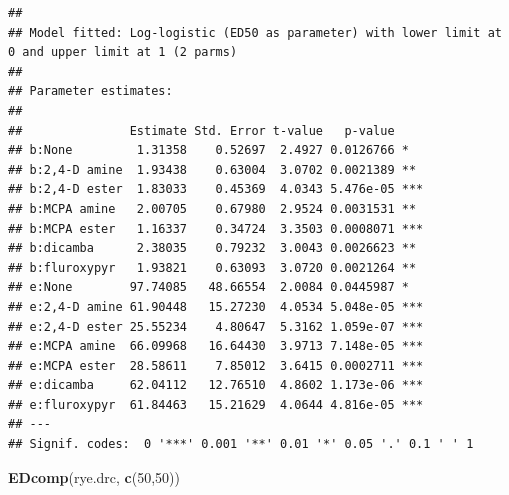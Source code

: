 \documentclass[letterpaper,]{book}
\newenvironment{Shaded}{\begin{snugshade}}{\end{snugshade}}
\newcommand{\DecValTok}[1]{\textcolor[rgb]{0.00,0.00,0.81}{#1}}
\newcommand{\KeywordTok}[1]{\textcolor[rgb]{0.13,0.29,0.53}{\textbf{#1}}}
\newcommand{\NormalTok}[1]{#1}
\begin{document}
\begin{verbatim}
## 
## Model fitted: Log-logistic (ED50 as parameter) with lower limit at 0 and upper limit at 1 (2 parms)
## 
## Parameter estimates:
## 
##               Estimate Std. Error t-value   p-value    
## b:None         1.31358    0.52697  2.4927 0.0126766 *  
## b:2,4-D amine  1.93438    0.63004  3.0702 0.0021389 ** 
## b:2,4-D ester  1.83033    0.45369  4.0343 5.476e-05 ***
## b:MCPA amine   2.00705    0.67980  2.9524 0.0031531 ** 
## b:MCPA ester   1.16337    0.34724  3.3503 0.0008071 ***
## b:dicamba      2.38035    0.79232  3.0043 0.0026623 ** 
## b:fluroxypyr   1.93821    0.63093  3.0720 0.0021264 ** 
## e:None        97.74085   48.66554  2.0084 0.0445987 *  
## e:2,4-D amine 61.90448   15.27230  4.0534 5.048e-05 ***
## e:2,4-D ester 25.55234    4.80647  5.3162 1.059e-07 ***
## e:MCPA amine  66.09968   16.64430  3.9713 7.148e-05 ***
## e:MCPA ester  28.58611    7.85012  3.6415 0.0002711 ***
## e:dicamba     62.04112   12.76510  4.8602 1.173e-06 ***
## e:fluroxypyr  61.84463   15.21629  4.0644 4.816e-05 ***
## ---
## Signif. codes:  0 '***' 0.001 '**' 0.01 '*' 0.05 '.' 0.1 ' ' 1
\end{verbatim}

\begin{Shaded}
\begin{Highlighting}[]
\KeywordTok{EDcomp}\NormalTok{(rye.drc, }\KeywordTok{c}\NormalTok{(}\DecValTok{50}\NormalTok{,}\DecValTok{50}\NormalTok{))}
\end{Highlighting}
\end{Shaded}
\end{document}
